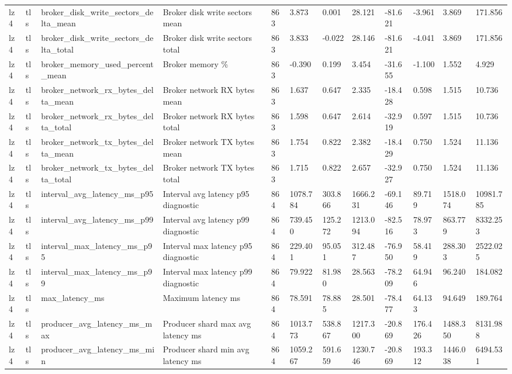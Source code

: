 \begin{longtable}{llllllllllll}
lz4 & tls & broker\_disk\_write\_sectors\_delta\_mean & Broker disk write sectors mean & 863 & 3.873 & 0.001 & 28.121 & -81.621 & -3.961 & 3.869 & 171.856 \\
lz4 & tls & broker\_disk\_write\_sectors\_delta\_total & Broker disk write sectors total & 863 & 3.833 & -0.022 & 28.146 & -81.621 & -4.041 & 3.869 & 171.856 \\
lz4 & tls & broker\_memory\_used\_percent\_mean & Broker memory \% & 863 & -0.390 & 0.199 & 3.454 & -31.655 & -1.100 & 1.552 & 4.929 \\
lz4 & tls & broker\_network\_rx\_bytes\_delta\_mean & Broker network RX bytes mean & 863 & 1.637 & 0.647 & 2.335 & -18.428 & 0.598 & 1.515 & 10.736 \\
lz4 & tls & broker\_network\_rx\_bytes\_delta\_total & Broker network RX bytes total & 863 & 1.598 & 0.647 & 2.614 & -32.919 & 0.597 & 1.515 & 10.736 \\
lz4 & tls & broker\_network\_tx\_bytes\_delta\_mean & Broker network TX bytes mean & 863 & 1.754 & 0.822 & 2.382 & -18.429 & 0.750 & 1.524 & 11.136 \\
lz4 & tls & broker\_network\_tx\_bytes\_delta\_total & Broker network TX bytes total & 863 & 1.715 & 0.822 & 2.657 & -32.927 & 0.750 & 1.524 & 11.136 \\
lz4 & tls & interval\_avg\_latency\_ms\_p95 & Interval avg latency p95 diagnostic & 864 & 1078.784 & 303.866 & 1666.231 & -69.146 & 89.719 & 1518.074 & 10981.785 \\
lz4 & tls & interval\_avg\_latency\_ms\_p99 & Interval avg latency p99 diagnostic & 864 & 739.450 & 125.272 & 1213.094 & -82.516 & 78.973 & 863.779 & 8332.253 \\
lz4 & tls & interval\_max\_latency\_ms\_p95 & Interval max latency p95 diagnostic & 864 & 229.401 & 95.051 & 312.487 & -76.950 & 58.419 & 288.303 & 2522.025 \\
lz4 & tls & interval\_max\_latency\_ms\_p99 & Interval max latency p99 diagnostic & 864 & 79.922 & 81.980 & 28.563 & -78.209 & 64.946 & 96.240 & 184.082 \\
lz4 & tls & max\_latency\_ms & Maximum latency ms & 864 & 78.591 & 78.885 & 28.501 & -78.477 & 64.133 & 94.649 & 189.764 \\
lz4 & tls & producer\_avg\_latency\_ms\_max & Producer shard max avg latency ms & 864 & 1013.773 & 538.867 & 1217.300 & -20.869 & 176.426 & 1488.350 & 8131.988 \\
lz4 & tls & producer\_avg\_latency\_ms\_min & Producer shard min avg latency ms & 864 & 1059.267 & 591.659 & 1230.746 & -20.869 & 193.312 & 1446.038 & 6494.531 \\

\end{longtable}
